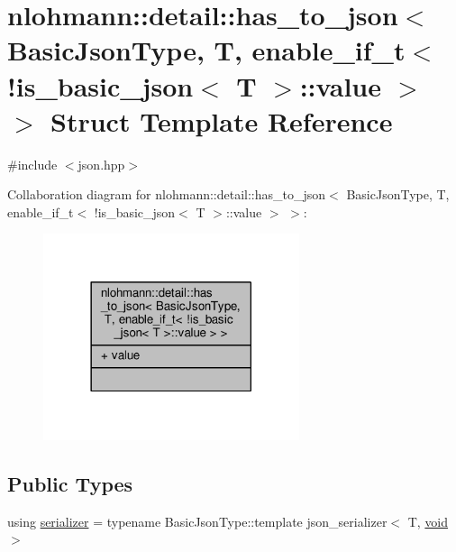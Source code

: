 \hypertarget{structnlohmann_1_1detail_1_1has__to__json_3_01BasicJsonType_00_01T_00_01enable__if__t_3_01_9is__4a8838c1c30336126696a126041e661c}{}\section{nlohmann\+:\+:detail\+:\+:has\+\_\+to\+\_\+json$<$ Basic\+Json\+Type, T, enable\+\_\+if\+\_\+t$<$ !is\+\_\+basic\+\_\+json$<$ T $>$\+:\+:value $>$ $>$ Struct Template Reference}
\label{structnlohmann_1_1detail_1_1has__to__json_3_01BasicJsonType_00_01T_00_01enable__if__t_3_01_9is__4a8838c1c30336126696a126041e661c}


{\ttfamily \#include $<$json.\+hpp$>$}



Collaboration diagram for nlohmann\+:\+:detail\+:\+:has\+\_\+to\+\_\+json$<$ Basic\+Json\+Type, T, enable\+\_\+if\+\_\+t$<$ !is\+\_\+basic\+\_\+json$<$ T $>$\+:\+:value $>$ $>$\+:
\nopagebreak
\begin{figure}[H]
\begin{center}
\leavevmode
\includegraphics[width=213pt]{structnlohmann_1_1detail_1_1has__to__json_3_01BasicJsonType_00_01T_00_01enable__if__t_3_01_9is__513ed309d76eebc5ab028695cb4ed37d}
\end{center}
\end{figure}
\subsection*{Public Types}
\begin{DoxyCompactItemize}
\item 
using \hyperlink{structnlohmann_1_1detail_1_1has__to__json_3_01BasicJsonType_00_01T_00_01enable__if__t_3_01_9is__4a8838c1c30336126696a126041e661c_a7af8dd95a01e7ca32f10075c9934b107}{serializer} = typename Basic\+Json\+Type\+::template json\+\_\+serializer$<$ T, \hyperlink{namespacenlohmann_1_1detail_a59fca69799f6b9e366710cb9043aa77d}{void} $>$
\end{DoxyCompactItemize}
